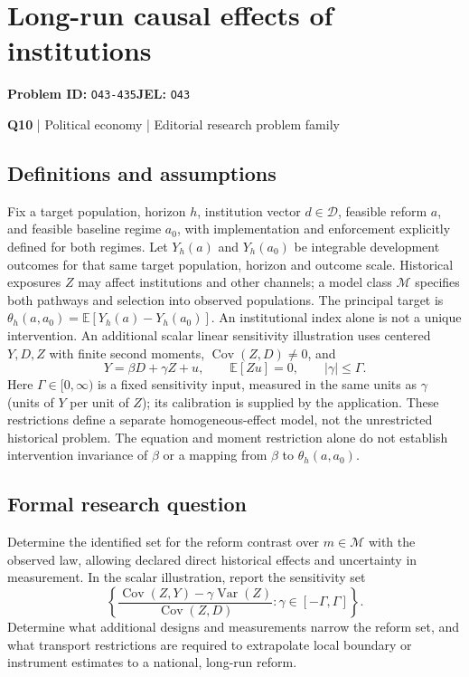 \documentclass[11pt,a4paper]{article}
\begin{document}
\section*{Long-run causal effects of institutions}
\textbf{Problem ID:} \texttt{O43-435}\quad \textbf{JEL:} \texttt{O43}\par
\label{problem:OP-0130}
\label{atlas:prob:Q10}
{\sffamily\small\color{muted}\textbf{Q10} | Political economy | Editorial research problem family\par}
\subsection*{Definitions and assumptions}
Fix a target population, horizon $h$, institution vector $d\in\mathcal D$, feasible reform $a$, and feasible baseline regime $a_0$, with implementation and enforcement explicitly defined for both regimes. Let $Y_h(a)$ and $Y_h(a_0)$ be integrable development outcomes for that same target population, horizon and outcome scale. Historical exposures $Z$ may affect institutions and other channels; a model class $\mathcal M$ specifies both pathways and selection into observed populations. The principal target is $\theta_h(a,a_0)=\mathbb E[Y_h(a)-Y_h(a_0)]$. An institutional index alone is not a unique intervention. An additional scalar linear sensitivity illustration uses centered $Y,D,Z$ with finite second moments, $\operatorname{Cov}(Z,D)\ne0$, and
\[
Y=\beta D+\gamma Z+u,\qquad \mathbb E[Zu]=0,\qquad |\gamma|\leq\Gamma.
\]
Here $\Gamma\in[0,\infty)$ is a fixed sensitivity input, measured in the same units as $\gamma$ (units of $Y$ per unit of $Z$); its calibration is supplied by the application. These restrictions define a separate homogeneous-effect model, not the unrestricted historical problem. The equation and moment restriction alone do not establish intervention invariance of $\beta$ or a mapping from $\beta$ to $\theta_h(a,a_0)$.
\subsection*{Formal research question}
Determine the identified set for the reform contrast over $m\in\mathcal M$ with the observed law, allowing declared direct historical effects and uncertainty in measurement. In the scalar illustration, report the sensitivity set
\[
\left\{\frac{\operatorname{Cov}(Z,Y)-\gamma\operatorname{Var}(Z)}{\operatorname{Cov}(Z,D)}:\gamma\in[-\Gamma,\Gamma]\right\}.
\]
Determine what additional designs and measurements narrow the reform set, and what transport restrictions are required to extrapolate local boundary or instrument estimates to a national, long-run reform.
\end{document}
